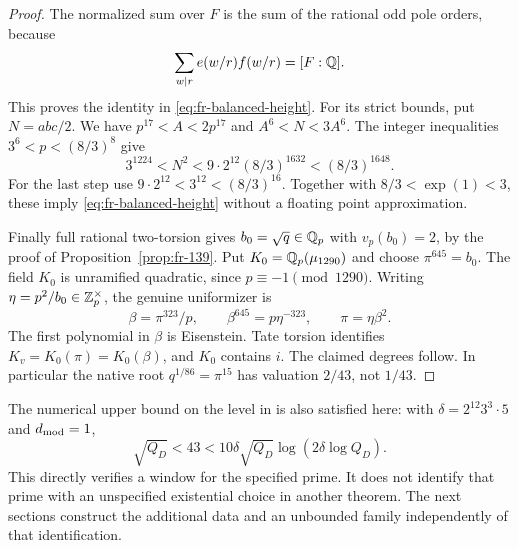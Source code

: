 \begin{proof}
The normalized sum over $F$ is the sum of the rational odd
pole orders, because
\[
 \sum_{w\mid r}e(w/r)f(w/r)=[F:\mathbb Q].
\]
This proves the identity in \eqref{eq:fr-balanced-height}.
For its strict bounds, put $N=abc/2$. We have
$p^{17}<A<2p^{17}$ and $A^6<N<3A^6$.
The integer inequalities $3^6<p<(8/3)^8$ give
\[
 3^{1224}<N^2
       <9\cdot2^{12}(8/3)^{1632}<(8/3)^{1648}.
\]
For the last step use
$9\cdot2^{12}<3^{12}<(8/3)^{16}$.
Together with $8/3<\exp(1)<3$, these imply
\eqref{eq:fr-balanced-height} without a floating point approximation.

Finally full rational two-torsion gives $b_0=\sqrt q\in\mathbb Q_p$
with $v_p(b_0)=2$, by the proof of Proposition~\ref{prop:fr-139}.
Put $K_0=\mathbb Q_p(\mu_{1290})$ and choose $\pi^{645}=b_0$.
The field $K_0$ is unramified quadratic, since $p\equiv-1\pmod{1290}$.
Writing $\eta=p^2/b_0\in\mathbb Z_p^\times$, the genuine uniformizer is
\begin{equation}\label{eq:fr-uniformizer}
 \beta=\pi^{323}/p,\qquad
 \beta^{645}=p\eta^{-323},\qquad\pi=\eta\beta^2.
\end{equation}
The first polynomial in $\beta$ is Eisenstein. Tate torsion
identifies $K_v=K_0(\pi)=K_0(\beta)$, and $K_0$ contains $i$.
The claimed degrees follow. In particular the native root
$q^{1/86}=\pi^{15}$ has valuation $2/43$, not $1/43$.
\end{proof}

The numerical upper bound on the level in
\cite[Theorem~5.7.1]{JoshiIV} is also satisfied here: with
$\delta=2^{12}3^3\cdot5$ and $d_{\rm mod}=1$,
\[
 \sqrt{Q_D}<43
       <10\delta\sqrt{Q_D}\log(2\delta\log Q_D).
\]
This directly verifies a window for the specified prime. It does
not identify that prime with an unspecified existential choice in
another theorem. The next sections construct the additional data
and an unbounded family independently of that identification.

